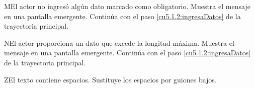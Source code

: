  \begin{UCtrayectoriaA}{M}{El actor no ingresó algún dato marcado como obligatorio.}
    \UCpaso[\UCsist] Muestra el mensaje  en una pantalla emergente.
    \UCpaso[] Continúa con el paso \ref{cu5.1.2:ingresaDatos} de la trayectoria principal.
 \end{UCtrayectoriaA}
 
 \begin{UCtrayectoriaA}{N}{El actor proporciona un dato que excede la longitud máxima.}
    \UCpaso[\UCsist] Muestra el mensaje  en una pantalla emergente.
    \UCpaso[] Continúa con el paso \ref{cu5.1.2:ingresaDatos} de la trayectoria principal.
 \end{UCtrayectoriaA}

  \begin{UCtrayectoriaA}{Z}{El texto contiene espacios.}
     \UCpaso[\UCsist] Sustituye los espacios por guiones bajos.
  \end{UCtrayectoriaA}